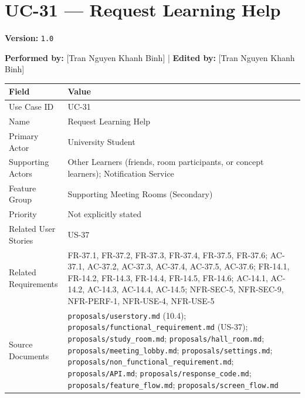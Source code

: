 \documentclass[12pt]{article}
\renewcommand{\baselinestretch}{1.5}
\begin{document}
\pagebreak
\hypertarget{sec:uc-31-request-learning-help}{}
\section*{UC-31 --- Request Learning Help}
\par\medskip

\textbf{Version:} \texttt{1.0}
\par\medskip

\textbf{Performed by:} [Tran Nguyen Khanh Binh] | \textbf{Edited by:} [Tran Nguyen Khanh Binh]
\par\medskip

\begingroup
\small
\renewcommand{\baselinestretch}{1.0}\selectfont
\renewcommand{\arraystretch}{1.15}
\setlength{\tabcolsep}{6pt}
\begin{longtable}{|>{\raggedright\arraybackslash}p{}|>{\raggedright\arraybackslash}p{}|}
\hline
\textbf{Field} & \textbf{Value} \\ \hline
\endhead
Use Case ID & UC-31 \\ \hline
Name & Request Learning Help \\ \hline
Primary Actor & University Student \\ \hline
Supporting Actors & Other Learners (friends, room participants, or concept learners); Notification Service \\ \hline
Feature Group & Supporting Meeting Rooms (Secondary) \\ \hline
Priority & Not explicitly stated \\ \hline
Related User Stories & US-37 \\ \hline
Related Requirements & FR-37.1, FR-37.2, FR-37.3, FR-37.4, FR-37.5, FR-37.6; AC-37.1, AC-37.2, AC-37.3, AC-37.4, AC-37.5, AC-37.6; FR-14.1, FR-14.2, FR-14.3, FR-14.4, FR-14.5, FR-14.6; AC-14.1, AC-14.2, AC-14.3, AC-14.4, AC-14.5; NFR-SEC-5, NFR-SEC-9, NFR-PERF-1, NFR-USE-4, NFR-USE-5 \\ \hline
Source Documents & \texttt{proposals/userstory.md} (10.4); \texttt{proposals/functional\_requirement.md} (US-37); \texttt{proposals/study\_room.md}; \texttt{proposals/hall\_room.md}; \texttt{proposals/meeting\_lobby.md}; \texttt{proposals/settings.md}; \texttt{proposals/non\_functional\_requirement.md}; \texttt{proposals/API.md}; \texttt{proposals/response\_code.md}; \texttt{proposals/feature\_flow.md}; \texttt{proposals/screen\_flow.md} \\ \hline
\end{longtable}
\endgroup
\par\medskip
\end{document}
